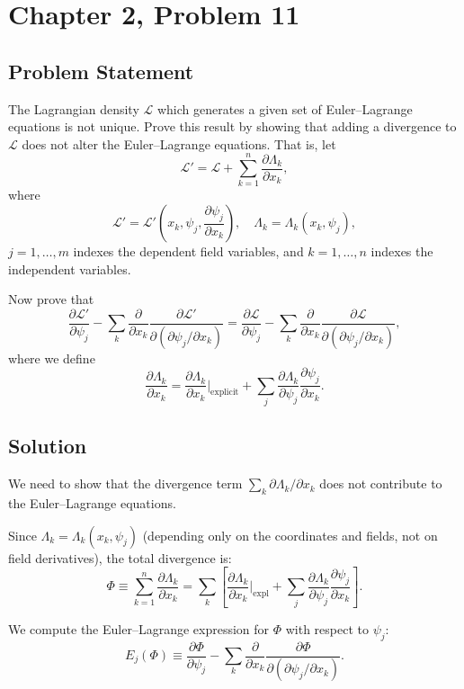 \documentclass[12pt]{article}
\begin{document}
\section*{Chapter 2, Problem 11}

\subsection*{Problem Statement}
The Lagrangian density $\mathscr{L}$ which generates a given set of Euler--Lagrange equations is not unique. Prove this result by showing that adding a divergence to $\mathscr{L}$ does not alter the Euler--Lagrange equations. That is, let
\[
  \mathscr{L}' = \mathscr{L} + \sum_{k=1}^{n} \frac{\partial \Lambda_k}{\partial x_k},
\]
where
\[
  \mathscr{L}' = \mathscr{L}'\!\left(x_k, \psi_j, \frac{\partial\psi_j}{\partial x_k}\right), \quad \Lambda_k = \Lambda_k\!\left(x_k, \psi_j\right),
\]
$j = 1,\ldots,m$ indexes the dependent field variables, and $k = 1,\ldots,n$ indexes the independent variables.

Now prove that
\[
  \frac{\partial\mathscr{L}'}{\partial\psi_j} - \sum_k \frac{\partial}{\partial x_k}\frac{\partial\mathscr{L}'}{\partial(\partial\psi_j/\partial x_k)} = \frac{\partial\mathscr{L}}{\partial\psi_j} - \sum_k \frac{\partial}{\partial x_k}\frac{\partial\mathscr{L}}{\partial(\partial\psi_j/\partial x_k)},
\]
where we define
\[
  \frac{\partial\Lambda_k}{\partial x_k} = \frac{\partial\Lambda_k}{\partial x_k}\bigg|_{\text{explicit}} + \sum_j \frac{\partial\Lambda_k}{\partial\psi_j}\frac{\partial\psi_j}{\partial x_k}.
\]

\subsection*{Solution}

We need to show that the divergence term $\sum_k \partial\Lambda_k/\partial x_k$ does not contribute to the Euler--Lagrange equations.

Since $\Lambda_k = \Lambda_k(x_k, \psi_j)$ (depending only on the coordinates and fields, not on field derivatives), the total divergence is:
\[
  \Phi \equiv \sum_{k=1}^{n}\frac{\partial\Lambda_k}{\partial x_k}
  = \sum_k\left[\frac{\partial\Lambda_k}{\partial x_k}\bigg|_{\text{expl}} + \sum_j \frac{\partial\Lambda_k}{\partial\psi_j}\frac{\partial\psi_j}{\partial x_k}\right].
\]

We compute the Euler--Lagrange expression for $\Phi$ with respect to $\psi_j$:
\[
  E_j(\Phi) \equiv \frac{\partial\Phi}{\partial\psi_j} - \sum_k \frac{\partial}{\partial x_k}\frac{\partial\Phi}{\partial(\partial\psi_j/\partial x_k)}.
\]
\end{document}

